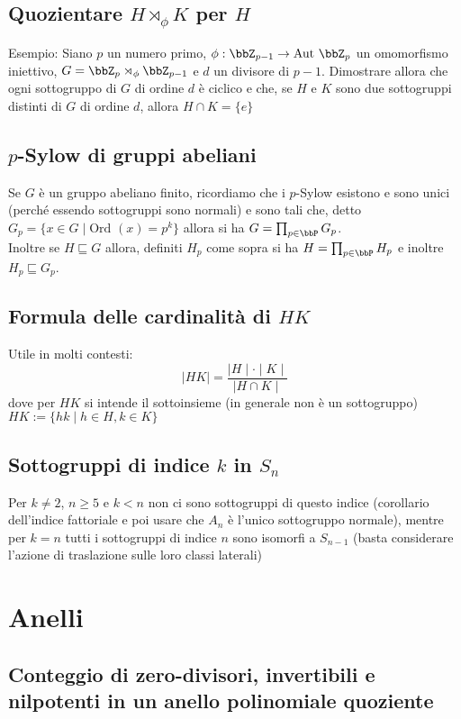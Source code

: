\documentclass[a4paper,NoNotes,GeneralMath]{stdmdoc}
\newcommand{\Aut}{\text{Aut }}
\newcommand{\sgr}{\sqsubseteq}
\begin{document}
	\subsection{Quozientare $H \rtimes_\phi K$ per $H$}
	Esempio: Siano $p$ un numero primo, $\phi: \bbZ_{p-1} \rar \Aut{\bbZ_p}$ un omomorfismo iniettivo, $G = \bbZ_p \rtimes_\phi \bbZ_{p-1}$ e $d$ un divisore di $p-1$. Dimostrare allora che ogni sottogruppo di $G$ di ordine $d$ è ciclico e che, se $H$ e $K$ sono due sottogruppi distinti di $G$ di ordine $d$, allora $H \cap K = \{e\}$

	\subsection{$p$-Sylow di gruppi abeliani}
	Se $G$ è un gruppo abeliano finito, ricordiamo che i $p$-Sylow esistono e sono unici (perché essendo sottogruppi sono normali) e sono tali che, detto $G_p = \{ x \in G \mid \text{Ord }(x) = p^k \}$ allora si ha $G = \prod_{p \in \bbP} G_p$. \\
	Inoltre se $H \sgr G$ allora, definiti $H_p$ come sopra si ha $H = \prod_{p \in \bbP} H_p$ e inoltre $H_p \sgr G_p$.
	
	\subsection{Formula delle cardinalità di $HK$}
	Utile in molti contesti: $$ \mid HK \mid = \frac{\mid H \mid \cdot \mid K \mid}{\mid H \cap K \mid} $$
	dove per $HK$ si intende il sottoinsieme (in generale non è un sottogruppo) $HK := \{ hk \mid h \in H, k \in K \}$
	
	\subsection{Sottogruppi di indice $k$ in $S_n$}
	Per $k \neq 2$, $n \ge 5$ e $k < n$ non ci sono sottogruppi di questo indice (corollario dell'indice fattoriale e poi usare che $A_n$ è l'unico sottogruppo normale), mentre per $k = n$ tutti i sottogruppi di indice $n$ sono isomorfi a $S_{n-1}$ (basta considerare l'azione di traslazione sulle loro classi laterali)

	\section{Anelli}
	\subsection{Conteggio di zero-divisori, invertibili e nilpotenti in un anello polinomiale quoziente}
\end{document}
